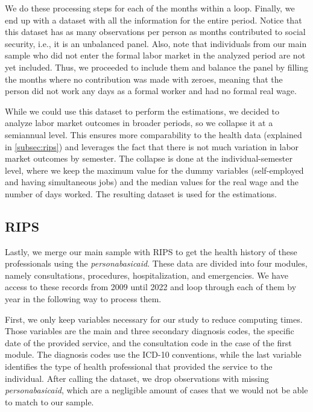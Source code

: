 \documentclass[12pt, a4paper]{article}
\begin{document}
We do these processing steps for each of the months within a loop. Finally, we end up with a dataset with all the information for the entire period. Notice that this dataset has as many observations per person as months contributed to social security, i.e., it is an unbalanced panel. Also, note that individuals from our main sample who did not enter the formal labor market in the analyzed period are not yet included. Thus, we proceeded to include them and balance the panel by filling the months where no contribution was made with zeroes, meaning that the person did not work any days as a formal worker and had no formal real wage.

While we could use this dataset to perform the estimations, we decided to analyze labor market outcomes in broader periods, so we collapse it at a semiannual level. This ensures more comparability to the health data (explained in \autoref{subsec:rips}) and leverages the fact that there is not much variation in labor market outcomes by semester. The collapse is done at the individual-semester level, where we keep the maximum value for the dummy variables (self-employed and having simultaneous jobs) and the median values for the real wage and the number of days worked. The resulting dataset is used for the estimations.

\subsection{RIPS \label{subsec:rips}}

Lastly, we merge our main sample with RIPS to get the health history of these professionals using the \textit{personabasicaid}. These data are divided into four modules, namely consultations, procedures, hospitalization, and emergencies. We have access to these records from 2009 until 2022 and loop through each of them by year in the following way to process them. 

First, we only keep variables necessary for our study to reduce computing times. Those variables are the main and three secondary diagnosis codes, the specific date of the provided service, and the consultation code in the case of the first module. The diagnosis codes use the ICD-10 conventions, while the last variable identifies the type of health professional that provided the service to the individual. After calling the dataset, we drop observations with missing \textit{personabasicaid}, which are a negligible amount of cases that we would not be able to match to our sample.
\end{document}
